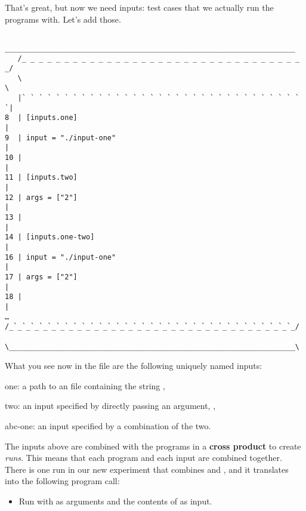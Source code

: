 \documentclass[a4paper,english]{article}
\begin{document}
    That's great, but now we need inputs: test cases that we actually run the
    programs with.
    Let's add those.

    \begin{verbatim}
    ____________________________________________________________________
   /_ _ _ _ _ _ _ _ _ _ _ _ _ _ _ _ _ _ _ _ _ _ _ _ _ _ _ _ _ _ _ _ _ _/
   \                                                                   \
   |` ` ` ` ` ` ` ` ` ` ` ` ` ` ` ` ` ` ` ` ` ` ` ` ` ` ` ` ` ` ` ` ` `|
8  | [inputs.one]                                                      |
9  | input = "./input-one"                                             |
10 |                                                                   |
11 | [inputs.two]                                                      |
12 | args = ["2"]                                                      |
13 |                                                                   |
14 | [inputs.one-two]                                                  |
16 | input = "./input-one"                                             |
17 | args = ["2"]                                                      |
18 |                                                                   |
…  /_`_`_`_`_`_`_`_`_`_`_`_`_`_`_`_`_`_`_`_`_`_`_`_`_`_`_`_`_`_`_`_`_`_/
   \___________________________________________________________________\

    \end{verbatim}

    What you see now in the file are the following uniquely named inputs:
    \begin{Description}[inputs]\setlength{\itemsep}{0cm}
    \item[one:] a path to an  file containing the string ,
    \item[two:] an input specified by directly passing an argument, \File{"2"},
    \item[abc-one:] an input specified by a combination of the two.
    \end{Description}

    The inputs above are combined with the programs in a \textbf{cross product}
    to create \emph{runs}.
    This means that each program and each input are combined together.
    There is one run in our new experiment that combines  and
    \File{one-two}, and it translates into the following program call:
    \begin{itemize}
    \item Run  with  as arguments and
    the contents of \File{./input-one} as input.
    \end{itemize}
\end{document}
